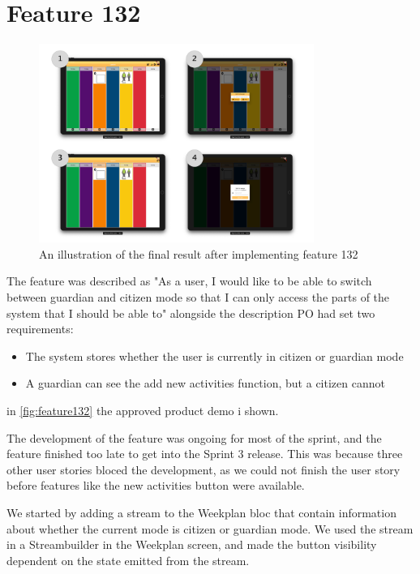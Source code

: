\section{Feature 132}
\begin{figure}[h]
    \centering
    \includegraphics[width=0.8\textwidth]{figures/feature_132.pdf}
    \caption{An illustration of the final result after implementing feature 132}
    \label{fig:feature132}
\end{figure}

The feature was described as "As a user, I would like to be able to switch between guardian and citizen mode so that I can only access the parts of the system that I should be able to" alongside the description \gls{PO} had set two requirements:

\begin{itemize}
  \item The system stores whether the user is currently in citizen or guardian mode
  \item A guardian can see the add new activities function, but a citizen cannot
\end{itemize}
in \autoref{fig:feature132} the approved product demo i shown.

The development of the feature was ongoing for most of the sprint, and the feature finished too late to get into the Sprint 3 release. This was because three other user stories bloced the development, as we could not finish the user story before features like the new activities button were available.

We started by adding a stream to the Weekplan \gls{bloc} that contain information about whether the current mode is citizen or guardian mode. We used the stream in a Streambuilder in the Weekplan screen, and made the button visibility dependent on the state emitted from the stream.

